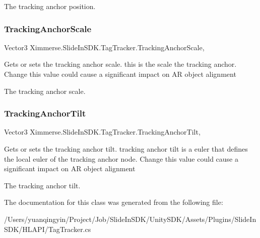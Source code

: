 The tracking anchor position.\mbox{\label{class_ximmerse_1_1_slide_in_s_d_k_1_1_tag_tracker_af8d9223bd307ccb6eb12129d6950e715}} 
\subsubsection{\texorpdfstring{Tracking\+Anchor\+Scale}{TrackingAnchorScale}}
{\footnotesize\ttfamily Vector3 Ximmerse.\+Slide\+In\+S\+D\+K.\+Tag\+Tracker.\+Tracking\+Anchor\+Scale\hspace{0.3cm}{\ttfamily [get]}, {\ttfamily [set]}}



Gets or sets the tracking anchor scale. this is the scale the tracking anchor. Change this value could cause a significant impact on AR object alignment 

The tracking anchor scale.\mbox{\label{class_ximmerse_1_1_slide_in_s_d_k_1_1_tag_tracker_a13f4739d9521aaef56b3862838944088}} 
\subsubsection{\texorpdfstring{Tracking\+Anchor\+Tilt}{TrackingAnchorTilt}}
{\footnotesize\ttfamily Vector3 Ximmerse.\+Slide\+In\+S\+D\+K.\+Tag\+Tracker.\+Tracking\+Anchor\+Tilt\hspace{0.3cm}{\ttfamily [get]}, {\ttfamily [set]}}



Gets or sets the tracking anchor tilt. tracking anchor tilt is a euler that defines the local euler of the tracking anchor node. Change this value could cause a significant impact on AR object alignment 

The tracking anchor tilt.

The documentation for this class was generated from the following file\+:\begin{DoxyCompactItemize}
\item 
/\+Users/yuanqingyin/\+Project/\+Job/\+Slide\+In\+S\+D\+K/\+Unity\+S\+D\+K/\+Assets/\+Plugins/\+Slide\+In\+S\+D\+K/\+H\+L\+A\+P\+I/Tag\+Tracker.\+cs\end{DoxyCompactItemize}
